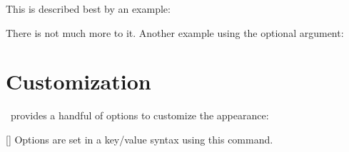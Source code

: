 \documentclass[load-preamble+]{cnltx-doc}
\begin{document}
This is described best by an example:
\begin{example}
\end{example}
There is not much more to it.  Another example using the optional argument:
\begin{example}
\end{example}

\section{Customization}
\BOHR\ provides a handful of options to customize the appearance:
\begin{commands}
  []
    Options are set in a key/value syntax using this command.
\end{commands}
\end{document}
